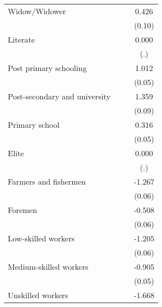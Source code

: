 {\begin{tabular}{l*{3}{c}}
Widow/Widower       &                     &                     &       0.426\sym{***}\\
                    &                     &                     &      (0.10)         \\
Literate            &                     &                     &       0.000         \\
                    &                     &                     &         (.)         \\
Post primary schooling&                     &                     &       1.012\sym{***}\\
                    &                     &                     &      (0.05)         \\
Post-secondary and university&                     &                     &       1.359\sym{***}\\
                    &                     &                     &      (0.09)         \\
Primary school      &                     &                     &       0.316\sym{***}\\
                    &                     &                     &      (0.05)         \\
Elite               &                     &                     &       0.000         \\
                    &                     &                     &         (.)         \\
Farmers and fishermen&                     &                     &      -1.267\sym{***}\\
                    &                     &                     &      (0.06)         \\
Foremen             &                     &                     &      -0.508\sym{***}\\
                    &                     &                     &      (0.06)         \\
Low-skilled workers &                     &                     &      -1.205\sym{***}\\
                    &                     &                     &      (0.06)         \\
Medium-skilled workers&                     &                     &      -0.905\sym{***}\\
                    &                     &                     &      (0.05)         \\
Unskilled workers   &                     &                     &      -1.668\sym{***}\\

\end{tabular}}
